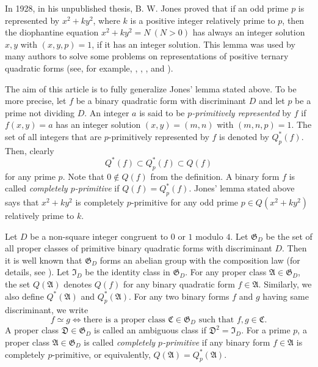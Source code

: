 \documentclass{amsart}
\theoremstyle{definition}
\theoremstyle{remark}
\numberwithin{equation}{section}
\begin{document}
In 1928, in his unpublished thesis,  B. W. Jones proved that if an odd prime $p$ is represented by $x^2+ky^2$, where  $k$ is a positive integer relatively prime to $p$,  then the diophantine equation $x^2+ky^2=N \ (N>0)$ has always an integer solution $x,y$ with 
$(x,y,p)=1$,  if it has an integer solution.  This  lemma was used by many authors to solve some problems on representations of positive ternary quadratic forms (see, for example, \cite{j}, \cite{ka1}, \cite{ka2}, \cite{oh1} and \cite{s}). 

The aim of this article is to fully generalize Jones' lemma stated above. To be more precise, let $f$ be a binary quadratic form with discriminant $D$ and let $p$ be a prime not dividing $D$. 
An integer $a$ is said to be {\it $p$-primitively represented} by $f$  if  $f(x,y)=a$ has an integer solution $(x,y)=(m,n)$ with $(m,n,p)=1$. The set of all integers that are $p$-primitively represented by $f$ is denoted by $Q_p^*(f)$.  Then, clearly
$$
Q^*(f) \subset Q_p^*(f) \subset Q(f)
$$
for any prime $p$. Note that $0 \not \in Q(f)$ from the definition.  A binary form $f$ is called {\it completely $p$-primitive} if $Q(f)=Q_p^*(f)$.  Jones' lemma stated above says that  $x^2+ky^2$ is completely $p$-primitive 
for any odd prime $p \in Q(x^2+ky^2)$ relatively prime to $k$. 

Let $D$ be a non-square integer congruent to $0$ or $1$  modulo $4$.  Let $\mathfrak G_D$ be the set of all proper classes of primitive binary quadratic forms with discriminant $D$.  Then it is well known that $\mathfrak G_D$ forms an abelian group with the composition law (for details, see \cite{Cas}).  Let $\mathfrak I_D$ be the identity  class in $\mathfrak G_D$. For any proper class $\mathfrak A \in \mathfrak G_D$, the set $Q(\mathfrak A)$ denotes $Q(f)$ for any binary quadratic form $f \in \mathfrak A$.   Similarly, we also define  $Q^*(\mathfrak A)$ and $Q_p^*(\mathfrak A)$. For any two binary forms $f$ and $g$ having same discriminant, we write
$$
f \simeq g \iff \text{there is a proper class $\mathfrak C \in \mathfrak G_D$ such that $f,g \in \mathfrak C$.}
$$
A proper class $\mathfrak D \in \mathfrak G_D$ is called an ambiguous class if  $\mathfrak D^2=\mathfrak I_D$.  For a prime $p$, a proper class $\mathfrak A \in \mathfrak G_D$ is called {\it completely $p$-primitive} if any binary form $f \in \mathfrak A$  is completely $p$-primitive, or equivalently, $Q(\mathfrak A)=Q_p^*(\mathfrak A)$.  
\end{document}
